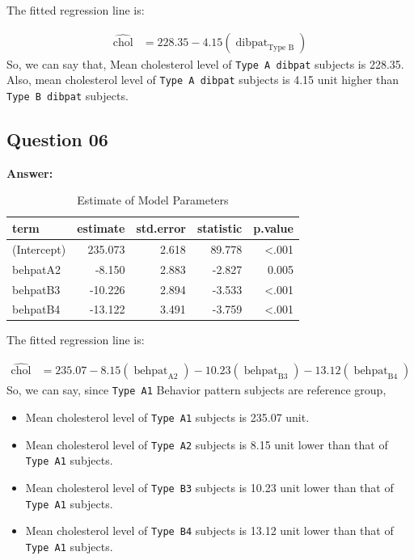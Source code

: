 \documentclass[
  12pt,
  oneside]{article}
\providecommand{\tightlist}{%
  \setlength{\itemsep}{0pt}\setlength{\parskip}{0pt}}
\begin{document}
The fitted regression line is:

\begin{equation}
\label{eq: eq2}
\begin{aligned}
\operatorname{\widehat{chol}} &= 228.35 - 4.15(\operatorname{dibpat}_{\operatorname{Type\ B}})
\end{aligned}
\end{equation}
So, we can say that, Mean cholesterol level of \texttt{Type\ A\ dibpat} subjects is 228.35. Also, mean cholesterol level of \texttt{Type\ A\ dibpat} subjects is 4.15 unit higher than \texttt{Type\ B\ dibpat} subjects.

\clearpage

\hypertarget{question-06}{%
\subsection{Question 06}\label{question-06}}

\textbf{Answer:}

\begin{table}[H]

\caption{\label{tab:Table-08}Estimate of Model Parameters}
\centering
\begin{tabular}[t]{lrrrr}
\toprule
term & estimate & std.error & statistic & p.value\\
\midrule
(Intercept) & 235.073 & 2.618 & 89.778 & <.001\\
behpatA2 & -8.150 & 2.883 & -2.827 & 0.005\\
behpatB3 & -10.226 & 2.894 & -3.533 & <.001\\
behpatB4 & -13.122 & 3.491 & -3.759 & <.001\\
\bottomrule
\end{tabular}
\end{table}

The fitted regression line is:

\begin{equation}
\label{eq: eq3}
\begin{aligned}
\operatorname{\widehat{chol}} &= 235.07 - 8.15(\operatorname{behpat}_{\operatorname{A2}}) - 10.23(\operatorname{behpat}_{\operatorname{B3}}) - 13.12(\operatorname{behpat}_{\operatorname{B4}})
\end{aligned}
\end{equation}
So, we can say, since \texttt{Type\ A1} Behavior pattern subjects are reference group,

\begin{itemize}
\tightlist
\item
  Mean cholesterol level of \texttt{Type\ A1} subjects is 235.07 unit.
\item
  Mean cholesterol level of \texttt{Type\ A2} subjects is 8.15 unit lower than that of \texttt{Type\ A1} subjects.
\item
  Mean cholesterol level of \texttt{Type\ B3} subjects is 10.23 unit lower than that of \texttt{Type\ A1} subjects.
\item
  Mean cholesterol level of \texttt{Type\ B4} subjects is 13.12 unit lower than that of \texttt{Type\ A1} subjects.
\end{itemize}
\end{document}
